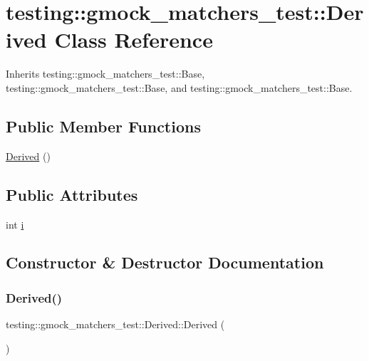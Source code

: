 \hypertarget{classtesting_1_1gmock__matchers__test_1_1_derived}{}\section{testing\+::gmock\+\_\+matchers\+\_\+test\+::Derived Class Reference}
\label{classtesting_1_1gmock__matchers__test_1_1_derived}


Inherits testing\+::gmock\+\_\+matchers\+\_\+test\+::\+Base, testing\+::gmock\+\_\+matchers\+\_\+test\+::\+Base, and testing\+::gmock\+\_\+matchers\+\_\+test\+::\+Base.

\subsection*{Public Member Functions}
\begin{DoxyCompactItemize}
\item 
\mbox{\hyperlink{classtesting_1_1gmock__matchers__test_1_1_derived_a3de17d9e4bfb19dcafb88d3cccbbeaf2}{Derived}} ()
\end{DoxyCompactItemize}
\subsection*{Public Attributes}
\begin{DoxyCompactItemize}
\item 
int \mbox{\hyperlink{classtesting_1_1gmock__matchers__test_1_1_derived_a357d6747c44d7af7159fb5898a782f1b}{i}}
\end{DoxyCompactItemize}


\subsection{Constructor \& Destructor Documentation}
\mbox{\label{classtesting_1_1gmock__matchers__test_1_1_derived_a3de17d9e4bfb19dcafb88d3cccbbeaf2}} 
\subsubsection{\texorpdfstring{Derived()}{Derived()}}
{\footnotesize\ttfamily testing\+::gmock\+\_\+matchers\+\_\+test\+::\+Derived\+::\+Derived (\begin{DoxyParamCaption}{ }\end{DoxyParamCaption})\hspace{0.3cm}{\ttfamily [inline]}}



